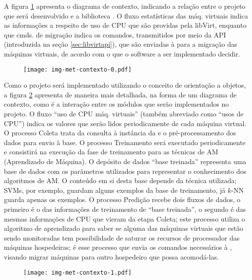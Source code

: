 A figura \ref{fig:contexto0} apresenta o diagrama de contexto,
indicando a relação entre o projeto que será desenvolvido e a biblioteca
\libvirt{}. O fluxo estatísticas das máq. virtuais indica as
informações a respeito de uso de CPU que são providas pela libVirt,
enquanto que cmds. de migração indica os comandos, transmitidos
por meio da API (introduzida na seção \ref{sec:libvirtapi}), que são enviadas
à \libvirt{} para a migração das máquinas virtuais, de acordo com o que o
software a ser implementado decidir.

\begin{figure}[htp]
\centering
\texttt{[image: img-met-contexto-0.pdf]}
\label{fig:contexto0}
\end{figure}

Como o projeto será implementado utilizando o conceito de orientação a
objetos, a figura \ref{fig:contexto1} apresenta
de maneira mais detalhada, na forma de um diagrama de contexto, como é a
interação entre os módulos que serão implementados no projeto. O fluxo
“uso de CPU máq. virtuais” (também abreviado como “usos de CPU”)
indica os valores que serão lidos periodicamente de cada máquina virtual.  O
processo Coleta trata da consulta à instância da \libvirt{} e o
pré-processamento dos dados para envio à base. O processo Treinamento
será executado periodicamente e consistirá na execução da fase de treinamento
para as técnicas de AM (Aprendizado de Máquina). O depósito de dados
``base treinada'' representa uma base de dados com os parâmetros
utilizados para representar o conhecimento dos algoritmos de AM. O conteúdo em
si desta base depende da técnica utilizada; SVMs, por exemplo, guardam alguns
exemplos da base de treinamento, já $k$-NN guarda apenas os
exemplos. O processo Predição recebe dois fluxos de dados, o primeiro
é o das informações de treinamento de ``base treinada'', o segundo é
das mesmas informações de CPU que vieram da etapa Coleta; este
processo utiliza o algoritmo de aprendizado para saber se alguma das máquinas
virtuais que estão sendo monitoradas tem possibilidade de saturar os recursos
de processador das máquinas hospedeiras; é esse processo que envia os comandos
necessários à \libvirt{}, visando migrar máquinas para outro hospedeiro que
possa acomodá-las.

\begin{figure}[htp]
\centering
\texttt{[image: img-met-contexto-1.pdf]}
\label{fig:contexto1}
\end{figure}

